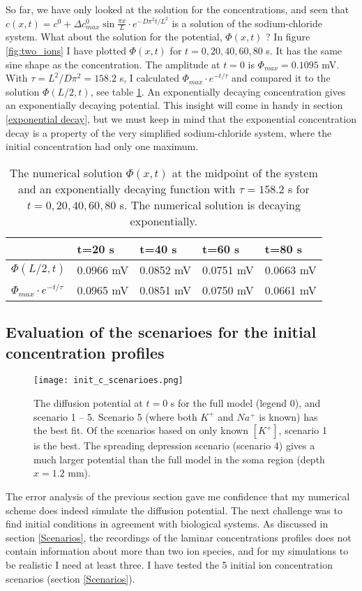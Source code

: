\documentclass{article}
\begin{document}
So far, we have only looked at the solution for the concentrations, and seen that $c(x,t) =c^0 + \Delta c^0_{max} \sin \frac{ \pi x}{L}\cdot e^{-D\pi^2 t /L^2}$ is a solution of the sodium-chloride system. What about the solution for the potential, $\Phi(x,t)$ ? In figure \ref{fig:two_ions} I have plotted $\Phi(x,t)$ for $t=0,20,40,60,80$ s. It has the same sine shape as the concentration. The amplitude at $t=0$ is $\Phi_{max} = 0.1095$ mV. With $\tau = L^2/D\pi^2 = 158.2$ s, I calculated $\Phi_{max} \cdot e^{-t/{\tau}}$ and compared it to the solution $\Phi(L/2,t)$, see table \ref{tab:error2}. An exponentially decaying concentration gives an exponentially decaying potential. This insight will come in handy in section \ref{exponential decay}, but we must keep in mind that the exponential concentration decay is a property of the very simplified sodium-chloride system, where the initial concentration had only one maximum. 

\begin{table}[h!]
  \centering
  \caption{The numerical solution $\Phi(x,t)$ at the midpoint of the system and an exponentially decaying function with $\tau = 158.2$ s for $t=0,20,40,60,80$ s. The numerical solution is decaying exponentially. }
  \label{tab:error2}
  \begin{tabular}{l||l|l|l|l}
 & t=20 s & t=40 s & t=60 s & t=80 s\\
 \hline
$\Phi(L/2,t)$  & 0.0966 mV &  0.0852 mV & 0.0751 mV & 0.0663 mV\\
\hline
$\Phi_{max} \cdot e^{-t/{\tau}}$  & 0.0965 mV & 0.0851 mV & 0.0750 mV & 0.0661 mV\\


 \end{tabular}
\end{table}


\subsection{Evaluation of the scenarioes for the initial concentration profiles}\label{The K/Na assumtion}

\begin{figure}
  \texttt{[image: init\_c\_scenarioes.png]}
  \caption{The diffusion potential at $t=0$ s for the full model (legend 0), and scenario 1 -- 5. Scenario 5 (where both $K^+$ and $Na^+$ is known) has the best fit. Of the scenarios based on only known $[K^+]$, scenario 1 is the best. The spreading depression scenario (scenario 4) gives a much larger potential than the full model in the soma region (depth $x=1.2$ mm). }
  \label{fig:init_c_scenarioes}
\end{figure}
The error analysis of the previous section gave me confidence that my numerical scheme does indeed simulate the diffusion potential. The next challenge was to find initial conditions in agreement with biological systems. As discussed in section \ref{Scenarios}, the recordings of the laminar concentrations profiles does not contain information about more than two ion species, and for my simulations to be realistic I need at least three. I have tested the 5 initial ion concentration scenarios (section \ref{Scenarios}). 
\end{document}

